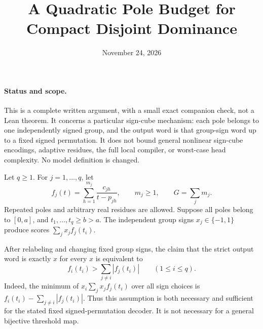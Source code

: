 \documentclass[11pt]{article}
\title{A Quadratic Pole Budget for Compact Disjoint Dominance}
\author{}
\date{November 24, 2026}
\begin{document}
\maketitle

\paragraph{Status and scope.}
This is a complete written argument, with a small exact companion check,
not a Lean theorem. It concerns a particular sign-cube mechanism: each
pole belongs to one independently signed group, and the output word is
that group-sign word up to a fixed signed permutation. It does not bound
general nonlinear sign-cube encodings, adaptive residues, the full local
compiler, or worst-case head complexity. No model definition is changed.

Let $q\geq1$. For $j=1,\ldots,q$, let
\[
 f_j(t)=\sum_{h=1}^{m_j}\frac{c_{jh}}{t-p_{jh}},
 \qquad m_j\geq1,\qquad G=\sum_jm_j.
\]
Repeated poles and arbitrary real residues are allowed. Suppose all poles
belong to $[0,a]$, and $t_1,\ldots,t_q\geq b>a$.
The independent group signs $x_j\in\{-1,1\}$ produce scores
$\sum_jx_jf_j(t_i)$.

After relabeling and changing fixed group signs, the claim that the
strict output word is exactly $x$ for every $x$ is equivalent to
\[
 f_i(t_i)>\sum_{j\ne i}|f_j(t_i)| \qquad(1\leq i\leq q).
 \tag{1}
\]
Indeed, the minimum of $x_i\sum_jx_jf_j(t_i)$ over all sign choices is
$f_i(t_i)-\sum_{j\ne i}|f_j(t_i)|$. Thus this assumption is both
necessary and sufficient for the stated fixed signed-permutation
decoder. It is not necessary for a general bijective threshold map.
\end{document}
